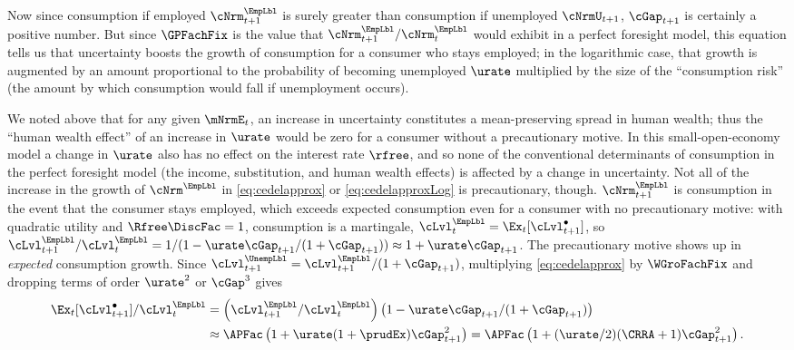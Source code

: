 \documentclass{econark}
\begin{document}
Now since consumption if employed ${\cNrm}^{\EmpLbl}_{t+1}$ is surely greater than consumption if unemployed $\cNrmU_{t+1}$, $\cGap _{t+1}$ is certainly a positive number.  But since ${\GPFachFix}$ is the value that ${\cNrm}^{\EmpLbl}_{t+1}/{\cNrm}^{\EmpLbl}_{t}$ would exhibit in a perfect foresight model, this equation tells us that uncertainty boosts the growth of consumption for a consumer who stays employed; in the logarithmic case, that growth is augmented by an amount proportional to the probability of becoming unemployed $\urate$ multiplied by the size of the ``consumption risk'' (the amount by which consumption would fall if unemployment occurs).

We noted above that for any given $\mNrmE_{t}$, an increase in uncertainty constitutes a mean-preserving spread in human wealth; thus the ``human wealth effect'' of an increase in $\urate$ would be zero for a consumer without a precautionary motive.  In this small-open-economy model a change in $\urate$ also has no effect on the interest rate $\rfree$, and so none of the conventional determinants of consumption in the perfect foresight model (the income, substitution, and human wealth effects) is affected by a change in uncertainty.  Not all of the increase in the growth of ${\cNrm}^{\EmpLbl}$ in \eqref{eq:cedelapprox} or \eqref{eq:cedelapproxLog} is precautionary, though.  ${\cNrm}^{\EmpLbl}_{t+1}$ is consumption in the event that the consumer stays employed, which exceeds expected consumption even for a consumer with no precautionary motive: with quadratic utility and $\Rfree\DiscFac=1$, consumption is a martingale, $\cLvl^{\EmpLbl}_{t} = \Ex_{t}[\cLvl^{\bullet}_{t+1}]$, so $\cLvl^{\EmpLbl}_{t+1}/\cLvl^{\EmpLbl}_{t} = 1/(1-\urate\cGap_{t+1}/(1+\cGap_{t+1})) \approx 1+\urate\cGap_{t+1}$.  The precautionary motive shows up in {\it expected} consumption growth.  Since $\cLvl^{\UnempLbl}_{t+1} = \cLvl^{\EmpLbl}_{t+1}/(1+\cGap_{t+1})$, multiplying \eqref{eq:cedelapprox} by $\WGroFachFix$ and dropping terms of order $\urate^{2}$ or $\cGap^{3}$ gives
\begin{equation}\begin{gathered}\begin{aligned}
\Ex_{t}[\cLvl^{\bullet}_{t+1}]/\cLvl^{\EmpLbl}_{t} & = \left(\cLvl^{\EmpLbl}_{t+1}/\cLvl^{\EmpLbl}_{t}\right)\left(1-\urate\cGap_{t+1}/(1+\cGap_{t+1})\right)
\\ & \approx \APFac\left(1+\urate(1+\prudEx)\cGap_{t+1}^{2}\right) = \APFac\left(1+(\urate/2)(\CRRA+1)\cGap_{t+1}^{2}\right) .
\end{aligned}\end{gathered}\end{equation}
\end{document}
